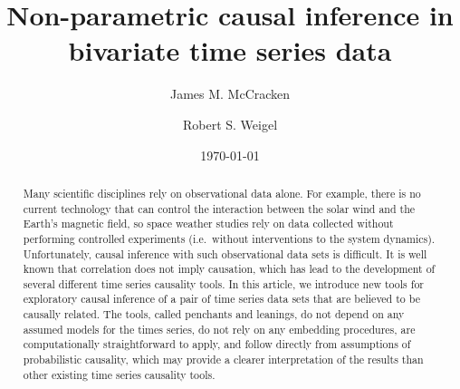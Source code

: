 \documentclass[a4paper,11pt,twocolumn]{article}
\begin{document}
\title{Non-parametric causal inference in bivariate time series data}
\author{James M. McCracken}
\author{Robert S. Weigel}
\date{\today}

\begin{abstract}
Many scientific disciplines rely on observational data alone.  For example, there is no current technology that can control the interaction between the solar wind and the Earth's magnetic field, so space weather studies rely on data collected without performing controlled experiments (i.e.\ without interventions to the system dynamics).  Unfortunately, causal inference with such observational data sets is difficult.  It is well known that correlation does not imply causation, which has lead to the development of several different time series causality tools.  In this article, we introduce new tools for exploratory causal inference of a pair of time series data sets that are believed to be causally related.  The tools, called penchants and leanings, do not depend on any assumed models for the times series, do not rely on any embedding procedures, are computationally straightforward to apply, and follow directly from assumptions of probabilistic causality, which may provide a clearer interpretation of the results than other existing time series causality tools.
\end{abstract}

\maketitle
\end{document}
